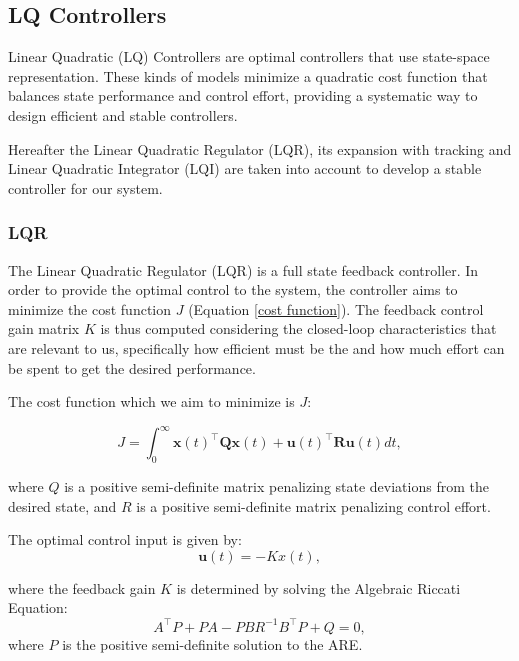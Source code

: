 \subsection{LQ Controllers}
\label{subsec:lq_controllers}
Linear Quadratic (LQ) Controllers are optimal controllers that use state-space representation. These kinds of models minimize a quadratic cost function that balances state performance and control effort, providing a systematic way to design efficient and stable controllers.

Hereafter the Linear Quadratic Regulator (LQR), its expansion with tracking and Linear Quadratic Integrator (LQI) are taken into account to develop a stable controller for our system.

\subsubsection{LQR}
\label{subsubsec:lqr}
The Linear Quadratic Regulator (LQR) is a full state feedback controller. In order to provide the optimal control to the system, the controller aims to minimize the cost function $J$ (Equation \ref{cost function}). The feedback control gain matrix $K$ is thus computed considering the closed-loop characteristics that are relevant to us, specifically how efficient must be the and how much effort can be spent to get the desired performance.

The cost function which we aim to minimize is $J$:

\begin{equation}
    J = \int_0^\infty \mathbf{x}(t)^\top \mathbf{Q} \mathbf{x}(t) + \mathbf{u}(t)^\top \mathbf{R} \mathbf{u}(t) dt,
    \label{cost function}
\end{equation}

where $Q$ is a positive semi-definite matrix penalizing state deviations from the desired state, and $R$ is a positive semi-definite matrix penalizing control effort.

The optimal control input is given by:
\begin{equation}
    \mathbf{u}(t) = -K x(t),
\end{equation}

where the feedback gain $K$ is determined by solving the Algebraic Riccati Equation:
\begin{equation}
    A^\top P + PA - PBR^{-1} B^\top P + Q = 0,
\end{equation}
where $P$ is the positive semi-definite solution to the ARE.

